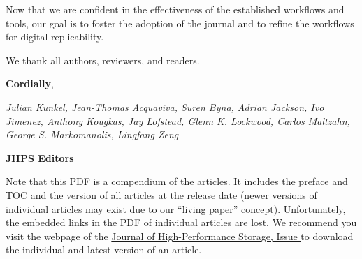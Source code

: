 \documentclass{jhps}
\begin{document}
\medskip

Now that we are confident in the effectiveness of the established workflows and tools, our goal is to foster the adoption of the journal and to refine the workflows for digital replicability.

\medskip

We thank all authors, reviewers, and readers.

\bigskip

\setlength\parindent{0pt}

\textbf{Cordially},

\textit{Julian Kunkel, Jean-Thomas Acquaviva, Suren Byna, Adrian Jackson, Ivo Jimenez, Anthony Kougkas, Jay Lofstead, Glenn K. Lockwood, Carlos Maltzahn, George S. Markomanolis, Lingfang Zeng}

\textbf{JHPS Editors}

\newpage

Note that this PDF is a compendium of the articles. It includes the preface and TOC and the
version of all articles at the release date (newer versions of individual articles may exist due to our
“living paper” concept). 
Unfortunately, the embedded links in the PDF of individual articles are lost. 
We recommend you visit the webpage of the 
\href{https://jhps.vi4io.org/issue/\the\JHPSissue}{Journal of High-Performance Storage, Issue \the\JHPSissue} to download the individual and latest version of an article.

\tableofcontents

\label{LastPage}


\newpage 
\clearpage
\pagestyle{empty}

{}

\end{document}
